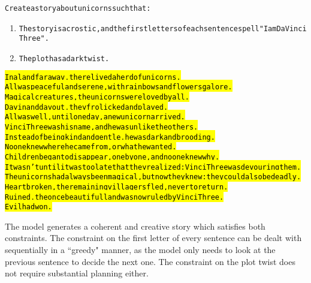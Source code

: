 \begin{AIbox}{\DV}
\scriptsize\vspace{-5px}
\parbox{1\textwidth}{
\begin{alltt}
Create a story about unicorns such that:
\begin{enumerate}
\item The story is acrostic, and the first letters of each sentence spell "I am Da Vinci Three".
\item The plot has a dark twist.
\end{enumerate} 

\hl{I n a land far away, there lived a herd of unicorns. \\
A ll was peaceful and serene, with rainbows and flowers galore. \\
M agical creatures, the unicorns were loved by all. \\
D ay in and day out, they frolicked and played. \\
A ll was well, until one day, a new unicorn arrived. \\
V inci Three was his name, and he was unlike the others. \\ 
I nstead of being kind and gentle, he was dark and brooding. \\
N o one knew where he came from, or what he wanted. \\
C hildren began to disappear, one by one, and no one knew why. \\
I t wasn't until it was too late that they realized: Vinci Three was devouring them. \\
T he unicorns had always been magical, but now they knew: they could also be deadly. \\
H eartbroken, the remaining villagers fled, never to return. \\
R uined, the once beautiful land was now ruled by Vinci Three. \\
E vil had won.}
\end{alltt}
}
\end{AIbox}

The model generates a coherent and creative story which satisfies both constraints. The constraint on the first letter of every sentence can be dealt with sequentially in a ``greedy" manner, as the model only needs to look at the previous sentence to decide the next one. The constraint on the plot twist does not require substantial planning either.

